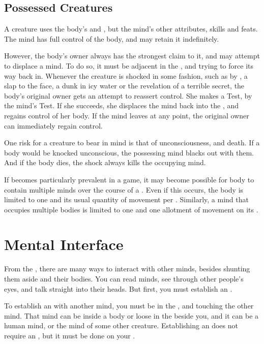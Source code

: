 \subsection{Possessed Creatures}

A {\possessed} creature uses the body's  and , but the {\possessing} mind's other attributes, skills and feats.
The {\possessing} mind has full control of the body, and may retain it indefinitely.

However, the body's owner always has the strongest claim to it, and may attempt to displace a {\possessing} mind.
To do so, it must be adjacent in the {\mentalrealm}, and trying to force its way back in.
Whenever the {\possessing} creature is shocked in some fashion, such as by {\damage}, a slap to the face, a dunk in icy water or the revelation of a terrible secret, the body's original owner gets an attempt to reassert control.
She makes a  Test, {\opposed} by the {\possessing} mind's  Test.
If she succeeds, she displaces the {\possessing} mind back into the {\mentalrealm}, and regains control of her body.
If the {\possessing} mind leaves at any point, the original owner can immediately regain control.

One risk for a {\possessing} creature to bear in mind is that of unconsciousness, and death.
If a body would be knocked unconscious, the possessing mind blacks out with them.
And if the body dies, the shock always kills the occupying mind.

If {\possession} becomes particularly prevalent in a game, it may become possible for body to contain multiple minds over the course of a {\round}.
Even if this occurs, the body is limited to one {\action} and its usual quantity of movement per {\round}.
Similarly, a mind that occupies multiple bodies is limited to one {\action} and one allotment of movement on its {\turn}.

\section{Mental Interface}

From the {\mentalrealm}, there are many ways to interact with other minds, besides shunting them aside and {\possessing} their bodies.
You can read minds, see through other people's eyes, and talk straight into their heads.
But first, you must establish an {\interface}.

To establish an {\interface} with another mind, you must be in the {\mentalrealm}, and touching the other mind.
That mind can be inside a body or loose in the {\mentalrealm} beside you, and it can be a human mind, or the mind of some other creature.
Establishing an {\interface} does not require an {\action}, but it must be done on your {\turn}.


